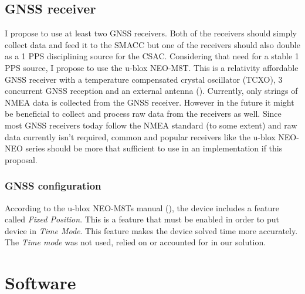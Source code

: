 \documentclass[12pt,english,a4paper]{report}
\begin{document}
\section{GNSS receiver}
I propose to use at least two GNSS receivers. Both of the receivers should simply collect data and feed it to the SMACC but one of the receivers should also double as a 1 PPS disciplining source for the CSAC. Considering that need for a stable 1 PPS source, I propose to use the u-blox NEO-M8T. This is a relativity affordable GNSS receiver with a temperature compensated crystal oscillator (TCXO), 3 concurrent GNSS reception and an external antenna (\cite{UBLOXM8T}). Currently, only strings of NMEA data is collected from the GNSS receiver. However in the future it might be beneficial to collect and process raw data from the receivers as well. Since most GNSS receivers today follow the NMEA standard (to some extent) and raw data currently isn't required, common and popular receivers like the u-blox NEO-NEO series should be more that sufficient to use in an implementation if this proposal.

\subsection{GNSS configuration}
According to the u-blox NEO-M8Ts manual (\cite{UBLOXM8TMANUAL}), the device includes a feature called \textit{Fixed Position}. This is a feature that must be enabled in order to put device in \textit{Time Mode}. This feature makes the device solved time more accurately. The \textit{Time mode} was not used, relied on or accounted for in our solution. 

\chapter{Software}
\end{document}
